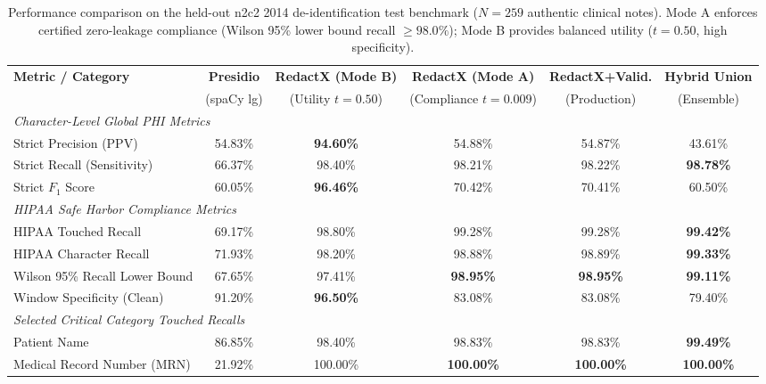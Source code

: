 \begin{table}[t]
\centering
\small
\caption{Performance comparison on the held-out n2c2 2014 de-identification test benchmark ($N=259$ authentic clinical notes). Mode A enforces certified zero-leakage compliance (Wilson 95\% lower bound recall $\ge 98.0\%$); Mode B provides balanced utility ($t=0.50$, high specificity).}
\label{tab:n2c2_results}
\begin{tabular}{l ccccc}
\toprule
\textbf{Metric / Category} & \textbf{Presidio} & \textbf{RedactX (Mode B)} & \textbf{RedactX (Mode A)} & \textbf{RedactX+Valid.} & \textbf{Hybrid Union} \\
 & (spaCy lg) & (Utility $t=0.50$) & (Compliance $t=0.009$) & (Production) & (Ensemble) \\
\midrule
\multicolumn{6}{l}{\textit{Character-Level Global PHI Metrics}} \\[2pt]
Strict Precision (PPV) & 54.83\% & \textbf{94.60\%} & 54.88\% & 54.87\% & 43.61\% \\
Strict Recall (Sensitivity) & 66.37\% & 98.40\% & 98.21\% & 98.22\% & \textbf{98.78\%} \\
Strict $F_1$ Score & 60.05\% & \textbf{96.46\%} & 70.42\% & 70.41\% & 60.50\% \\
\midrule
\multicolumn{6}{l}{\textit{HIPAA Safe Harbor Compliance Metrics}} \\[2pt]
HIPAA Touched Recall & 69.17\% & 98.80\% & 99.28\% & 99.28\% & \textbf{99.42\%} \\
HIPAA Character Recall & 71.93\% & 98.20\% & 98.88\% & 98.89\% & \textbf{99.33\%} \\
Wilson 95\% Recall Lower Bound & 67.65\% & 97.41\% & \textbf{98.95\%} & \textbf{98.95\%} & \textbf{99.11\%} \\
Window Specificity (Clean) & 91.20\% & \textbf{96.50\%} & 83.08\% & 83.08\% & 79.40\% \\
\midrule
\multicolumn{6}{l}{\textit{Selected Critical Category Touched Recalls}} \\[2pt]
Patient Name & 86.85\% & 98.40\% & 98.83\% & 98.83\% & \textbf{99.49\%} \\
Medical Record Number (MRN) & 21.92\% & 100.00\% & \textbf{100.00\%} & \textbf{100.00\%} & \textbf{100.00\%} \\

\end{tabular}
\end{table}
